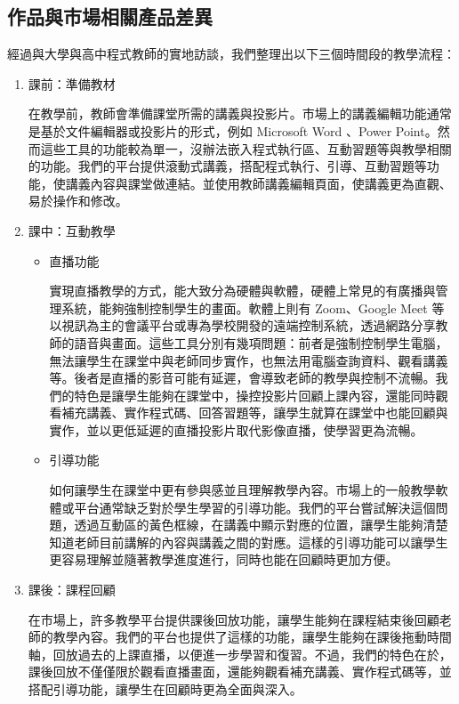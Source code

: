 \documentclass[12pt]{article}
\begin{document}
\subsection{作品與市場相關產品差異}

經過與大學與高中程式教師的實地訪談，我們整理出以下三個時間段的教學流程：

\begin{enumerate}[label=(\arabic*)]
  \setlength{\parindent}{2em}
  \item 課前：準備教材
    \par 在教學前，教師會準備課堂所需的講義與投影片。市場上的講義編輯功能通常是基於文件編輯器或投影片的形式，例如 Microsoft Word 、Power Point。然而這些工具的功能較為單一，沒辦法嵌入程式執行區、互動習題等與教學相關的功能。我們的平台提供滾動式講義，搭配程式執行、引導、互動習題等功能，使講義內容與課堂做連結。並使用教師講義編輯頁面，使講義更為直觀、易於操作和修改。
  \item 課中：互動教學
  \begin{itemize}
    \setlength{\parindent}{2em}
    \item 直播功能
      \par 實現直播教學的方式，能大致分為硬體與軟體，硬體上常見的有廣播與管理系統，能夠強制控制學生的畫面。軟體上則有 Zoom、Google Meet 等以視訊為主的會議平台或專為學校開發的遠端控制系統，透過網路分享教師的語音與畫面。這些工具分別有幾項問題：前者是強制控制學生電腦，無法讓學生在課堂中與老師同步實作，也無法用電腦查詢資料、觀看講義等。後者是直播的影音可能有延遲，會導致老師的教學與控制不流暢。我們的特色是讓學生能夠在課堂中，操控投影片回顧上課內容，還能同時觀看補充講義、實作程式碼、回答習題等，讓學生就算在課堂中也能回顧與實作，並以更低延遲的直播投影片取代影像直播，使學習更為流暢。
    \item 引導功能
      \par 如何讓學生在課堂中更有參與感並且理解教學內容。市場上的一般教學軟體或平台通常缺乏對於學生學習的引導功能。我們的平台嘗試解決這個問題，透過互動區的黃色框線，在講義中顯示對應的位置，讓學生能夠清楚知道老師目前講解的內容與講義之間的對應。這樣的引導功能可以讓學生更容易理解並隨著教學進度進行，同時也能在回顧時更加方便。
  \end{itemize}
  \item 課後：課程回顧
  \par 在市場上，許多教學平台提供課後回放功能，讓學生能夠在課程結束後回顧老師的教學內容。我們的平台也提供了這樣的功能，讓學生能夠在課後拖動時間軸，回放過去的上課直播，以便進一步學習和復習。不過，我們的特色在於，課後回放不僅僅限於觀看直播畫面，還能夠觀看補充講義、實作程式碼等，並搭配引導功能，讓學生在回顧時更為全面與深入。\\
\end{enumerate}
\end{document}
